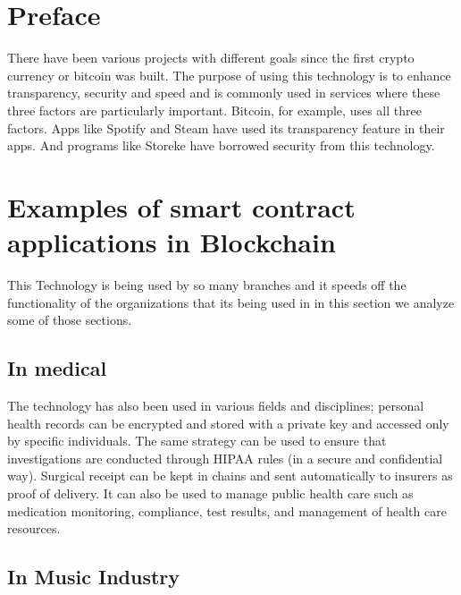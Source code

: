 \section{Preface}
There have been various projects with different goals since the first crypto currency or bitcoin was built. The purpose of using this technology is to enhance transparency, security and speed and is commonly used in services where these three factors are particularly important.
Bitcoin, for example, uses all three factors. Apps like Spotify and Steam have used its transparency feature in their apps. And programs like Storeke have borrowed security from this technology.
\section{Examples of smart contract applications in Blockchain}
This Technology is being used by so many branches and it speeds off the functionality of the organizations that its being used in in this section we analyze some of those sections.

\subsection{In medical}
The technology has also been used in various fields and disciplines; personal health records can be encrypted and stored with a private key and accessed only by specific individuals. The same strategy can be used to ensure that investigations are conducted through HIPAA rules (in a secure and confidential way). Surgical receipt can be kept in chains and sent automatically to insurers as proof of delivery. It can also be used to manage public health care such as medication monitoring, compliance, test results, and management of health care resources.
\subsection{In Music Industry}

